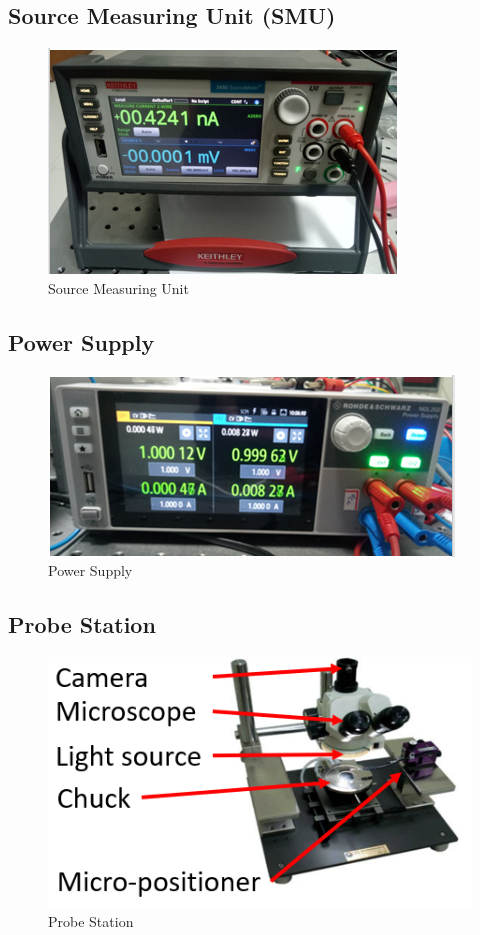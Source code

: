 \subsection{Source Measuring Unit (SMU)}
\begin{figure}[H]
	\centering
   \includegraphics[scale=0.56]{Images/14.png} 
   \caption{Source Measuring Unit}
\end{figure}

\subsection{Power Supply}
\begin{figure}[H]
	\centering
   \includegraphics[scale=0.56]{Images/15.png} 
   \caption{Power Supply}
\end{figure}

\subsection{Probe Station}
\begin{figure}[H]
	\centering
   \includegraphics[scale=0.56]{Images/16.png} 
   \caption{Probe Station}
\end{figure}

